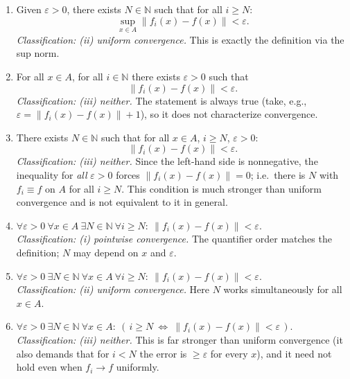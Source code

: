 \documentclass[11pt,a4paper]{article}
\begin{document}
\begin{enumerate}
\renewcommand\labelenumi{(\alph{enumi})}

\item Given $\varepsilon>0$, there exists $N\in\mathbb{N}$ such that for all $i\ge N$:
\[
\sup_{x\in A}\|f_i(x)-f(x)\|<\varepsilon.
\]
\textit{Classification: (ii) uniform convergence.} This is exactly the definition via the sup norm.

\item For all $x\in A$, for all $i\in\mathbb{N}$ there exists $\varepsilon>0$ such that
\[
\|f_i(x)-f(x)\|<\varepsilon.
\]
\textit{Classification: (iii) neither.} The statement is always true (take, e.g., $\varepsilon=\|f_i(x)-f(x)\|+1$), so it does not characterize convergence.

\item There exists $N\in\mathbb{N}$ such that for all $x\in A$, $i\ge N$, $\varepsilon>0$:
\[
\|f_i(x)-f(x)\|<\varepsilon.
\]
\textit{Classification: (iii) neither.} Since the left-hand side is nonnegative, the inequality for \emph{all} $\varepsilon>0$ forces $\|f_i(x)-f(x)\|=0$; i.e.\ there is $N$ with $f_i\equiv f$ on $A$ for all $i\ge N$. This condition is much stronger than uniform convergence and is not equivalent to it in general.

\item[\textit{*}d)] $\forall\varepsilon>0\ \forall x\in A\ \exists N\in\mathbb{N}\ \forall i\ge N:\ \|f_i(x)-f(x)\|<\varepsilon$.\\
\textit{Classification: (i) pointwise convergence.} The quantifier order matches the definition; $N$ may depend on $x$ and $\varepsilon$.

\item[\textit{*}e)] $\forall\varepsilon>0\ \exists N\in\mathbb{N}\ \forall x\in A\ \forall i\ge N:\ \|f_i(x)-f(x)\|<\varepsilon$.\\
\textit{Classification: (ii) uniform convergence.} Here $N$ works simultaneously for all $x\in A$.

\item[\textit{*}f)] $\forall\varepsilon>0\ \exists N\in\mathbb{N}\ \forall x\in A:\ (\,i\ge N\ \Leftrightarrow\ \|f_i(x)-f(x)\|<\varepsilon\,)$.\\
\textit{Classification: (iii) neither.} This is far stronger than uniform convergence (it also demands that for $i<N$ the error is $\ge\varepsilon$ for every $x$), and it need not hold even when $f_i\to f$ uniformly.
\end{enumerate}
\end{document}
